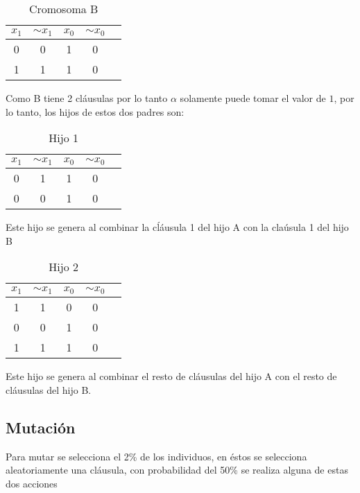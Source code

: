 \documentclass[a4paper]{article}
\begin{document}
\begin{table}[H]
	\centering
	\caption{Cromosoma B}
	\begin{tabular}{|c | c | c|  c|  c|}
		\hline
		$x_1$ & $ \sim{x_1}$ & $x_0$ & $ \sim{x_0}$\\
		\hline
		0 & 0& 1 & 0\\
		\hline
		1 & 1& 1 & 0\\
		\hline
	\end{tabular}
\end{table}

Como B tiene 2 cláusulas por lo tanto $\alpha$ solamente puede tomar el valor de $1$, por lo tanto, los hijos de estos dos padres son:

\begin{table}[H]
	\centering
	\caption{Hijo 1}
	\begin{tabular}{|c | c | c|  c|  c|}
		\hline
		$x_1$ & $ \sim{x_1}$ & $x_0$ & $ \sim{x_0}$\\
		\hline
		0 & 1& 1 & 0\\
		\hline
		0 & 0& 1 & 0\\
		\hline
	\end{tabular}
\end{table}

Este hijo se genera al combinar la cĺáusula 1 del hijo A con la claúsula 1 del hijo B

\begin{table}[H]
	\centering
	\caption{Hijo 2}
	\begin{tabular}{|c | c | c|  c|  c|}
		\hline
		$x_1$ & $ \sim{x_1}$ & $x_0$ & $ \sim{x_0}$\\
		\hline
		1 & 1& 0 & 0\\
		\hline
		0 & 0& 1 & 0\\
		\hline
		1 & 1& 1 & 0\\
		\hline
	\end{tabular}
\end{table}

Este hijo se genera al combinar el resto de cláusulas del hijo A con el resto de cláusulas del hijo B.

\subsection{Mutación}

Para mutar se selecciona el 2\% de los individuos, en éstos se selecciona aleatoriamente una cláusula, con probabilidad del 50\% se realiza alguna de estas dos acciones
\end{document}
